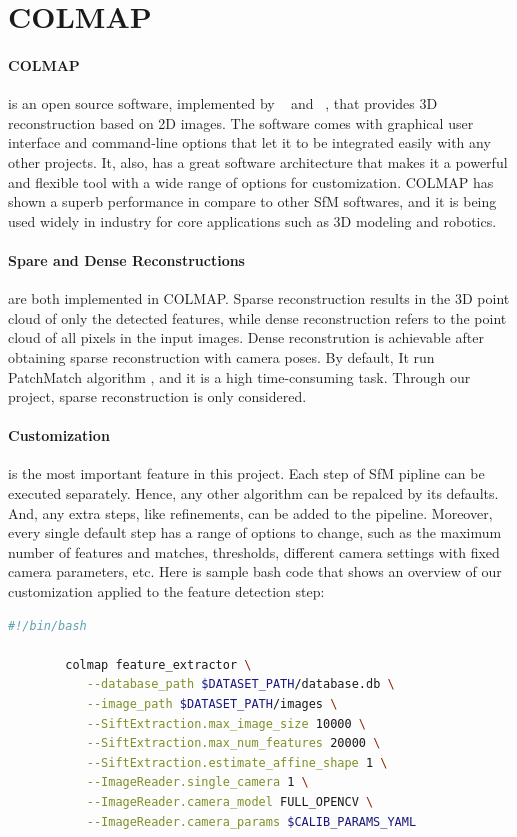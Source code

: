 \documentclass[11pt]{article}
\begin{document}
    \section{COLMAP}
    \paragraph{COLMAP} is an open source software, implemented by ~\cite{schoenberger2016sfm} and ~\cite{schoenberger2016mvs},
    that provides 3D reconstruction based on 2D images. The software comes with graphical user interface and
    command-line options that let it to be integrated easily with any other projects. It, also, has a great software
    architecture that makes it a powerful and flexible tool with a wide range of options for customization. COLMAP has
    shown a superb performance in compare to other SfM softwares, and it is being used widely in industry for
    core applications such as 3D modeling and robotics.

    \paragraph{Spare and Dense Reconstructions} are both implemented in COLMAP. Sparse reconstruction results in
    the 3D point cloud of only the detected features, while dense reconstruction refers to the point cloud of all
    pixels in the input images. Dense reconstrution is achievable after obtaining sparse reconstruction with camera
    poses. By default, It run PatchMatch algorithm \cite{journals/tog/BarnesSFG09}, and it is a high time-consuming task.
    Through our project, sparse reconstruction is only considered.

    \paragraph{Customization} is the most important feature in this project. Each step of SfM pipline can be executed
    separately. Hence, any other algorithm can be repalced by its defaults. And, any extra steps, like refinements,
    can be added to the pipeline. Moreover, every single default step has a range of options to change, such as
    the maximum number of features and matches, thresholds, different camera settings with fixed camera parameters, etc.
    Here is sample bash code that shows an overview of our customization applied to the feature detection step:

    \begin{lstlisting}[language=bash,caption={colmapsparse.sh},label={lst:lstlisting2}]
        #!/bin/bash

        colmap feature_extractor \
           --database_path $DATASET_PATH/database.db \
           --image_path $DATASET_PATH/images \
           --SiftExtraction.max_image_size 10000 \
           --SiftExtraction.max_num_features 20000 \
           --SiftExtraction.estimate_affine_shape 1 \
           --ImageReader.single_camera 1 \
           --ImageReader.camera_model FULL_OPENCV \
           --ImageReader.camera_params $CALIB_PARAMS_YAML
    \end{lstlisting}
\end{document}
